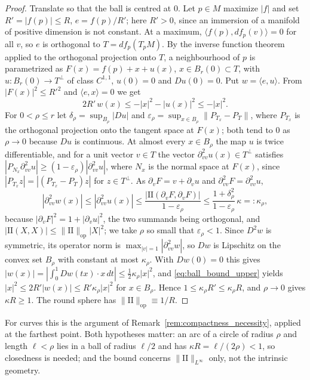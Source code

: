 \documentclass[11pt,reqno]{amsart}
\theoremstyle{definition}
\providecommand{\II}{\mathrm{I\!I}}
\newcommand{\op}{\mathrm{op}}
\numberwithin{equation}{section}
\providecommand{\II}{\mathrm{II}}
\begin{document}
\begin{proof}
Translate so that the ball is centred at $0$. Let $p \in M$ maximize $|f|$ and set $R' = |f(p)| \le R$, $e = f(p)/R'$; here $R' > 0$, since an immersion of a manifold of positive dimension is not constant. At a maximum, $\langle f(p), df_p(v)\rangle = 0$ for all $v$, so $e$ is orthogonal to $T = df_p(T_pM)$. By the inverse function theorem applied to the orthogonal projection onto $T$, a neighbourhood of $p$ is parametrized as $F(x) = f(p) + x + u(x)$, $x \in B_r(0) \subset T$, with $u\colon B_r(0) \to T^\perp$ of class $C^{1,1}$, $u(0) = 0$ and $Du(0) = 0$. Put $w = \langle e, u\rangle$. From $|F(x)|^2 \le R'^2$ and $\langle e, x\rangle = 0$ we get
\begin{equation}
\label{eq:ball_bound_upper}
2R'\,w(x) \le -|x|^2 - |u(x)|^2 \le -|x|^2 .
\end{equation}
For $0 < \rho \le r$ let $\delta_\rho = \sup_{B_\rho}|Du|$ and $\varepsilon_\rho = \sup_{x \in B_\rho}\|P_{T_x} - P_T\|$, where $P_{T_x}$ is the orthogonal projection onto the tangent space at $F(x)$; both tend to $0$ as $\rho \to 0$ because $Du$ is continuous. At almost every $x \in B_\rho$ the map $u$ is twice differentiable, and for a unit vector $v \in T$ the vector $\partial^2_{vv}u(x) \in T^\perp$ satisfies $|P_{N_x}\partial^2_{vv}u| \ge (1 - \varepsilon_\rho)|\partial^2_{vv}u|$, where $N_x$ is the normal space at $F(x)$, since $|P_{T_x} z| = |(P_{T_x} - P_T)z|$ for $z \in T^\perp$. As $\partial_v F = v + \partial_v u$ and $\partial^2_{vv}F = \partial^2_{vv}u$,
\[
|\partial^2_{vv} w(x)| \le |\partial^2_{vv}u(x)| \le \frac{|\II(\partial_vF, \partial_vF)|}{1 - \varepsilon_\rho} \le \frac{1+\delta_\rho^2}{1 - \varepsilon_\rho}\,\kappa =: \kappa_\rho ,
\]
because $|\partial_v F|^2 = 1 + |\partial_v u|^2$, the two summands being orthogonal, and $|\II(X,X)| \le \|\II\|_{\op}|X|^2$; we take $\rho$ so small that $\varepsilon_\rho < 1$. Since $D^2 w$ is symmetric, its operator norm is $\max_{|v| = 1}|\partial^2_{vv}w|$, so $Dw$ is Lipschitz on the convex set $B_\rho$ with constant at most $\kappa_\rho$. With $Dw(0) = 0$ this gives $|w(x)| = |\int_0^1 Dw(tx)\cdot x\,dt| \le \tfrac12\kappa_\rho|x|^2$, and \eqref{eq:ball_bound_upper} yields $|x|^2 \le 2R'|w(x)| \le R'\kappa_\rho|x|^2$ for $x \in B_\rho$. Hence $1 \le \kappa_\rho R' \le \kappa_\rho R$, and $\rho \to 0$ gives $\kappa R \ge 1$. The round sphere has $\|\II\|_{\op} \equiv 1/R$.
\end{proof}

For curves this is the argument of Remark~\ref{rem:compactness_necessity}, applied at the farthest point. Both hypotheses matter: an arc of a circle of radius $\rho$ and length $\ell < \rho$ lies in a ball of radius $\ell/2$ and has $\kappa R = \ell/(2\rho) < 1$, so closedness is needed; and the bound concerns $\|\II\|_{L^\infty}$ only, not the intrinsic geometry.
\end{document}
